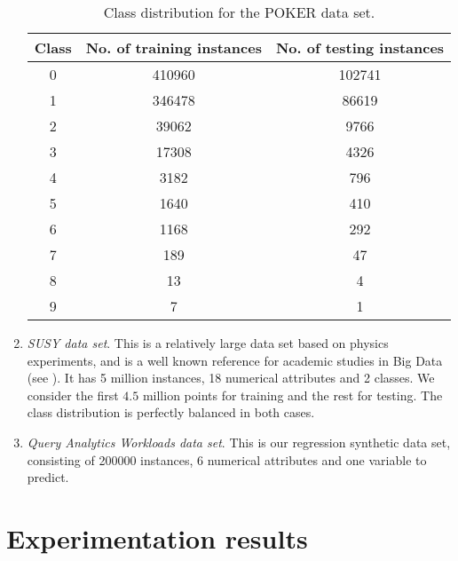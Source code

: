 \begin{enumerate}[1.]
    \begin{table}[h!]
  \centering
  \caption{Class distribution for the POKER data set.}
  \label{tab:poker-class}
  \begin{tabular}{ccc}
    \hline
Class & No. of training instances & No. of testing instances \\ \hline
0              & 410960                                & 102741                       \\
1              & 346478                                & 86619                        \\
2              & 39062                                 & 9766                         \\
3              & 17308                                 & 4326                         \\
4              & 3182                                  & 796                          \\
5              & 1640                                  & 410                          \\
6              & 1168                                  & 292                          \\
7              & 189                                   & 47                           \\
8              & 13                                    & 4                            \\
9              & 7                                     & 1\\
  \hline
  \end{tabular}
  \end{table}

\item \textit{SUSY data set}. This is a relatively large data set based on physics experiments, and is a well known reference for academic studies in Big Data (see \cite {baldi2014searching}). It has 5 million instances, 18 numerical attributes and 2 classes. We consider the first $4.5$ million points for training and the rest for testing. The class distribution is perfectly balanced in both cases.

\item \textit{Query Analytics Workloads data set}. This is our regression synthetic data set, consisting of 200000 instances, 6 numerical attributes and one variable to predict.
\end{enumerate}

\section{Experimentation results}

